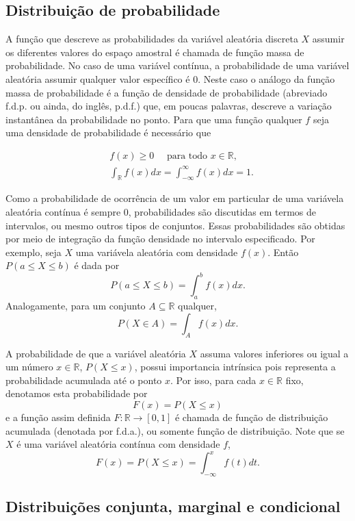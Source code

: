 \documentclass[
]{book}
\theoremstyle{definition}
\theoremstyle{definition}
\theoremstyle{definition}
\theoremstyle{remark}
\begin{document}
\hypertarget{distribuiuxe7uxe3o-de-probabilidade}{%
\subsection{Distribuição de probabilidade}\label{distribuiuxe7uxe3o-de-probabilidade}}

A função que descreve as probabilidades da variável aleatória discreta \(X\) assumir os diferentes valores do espaço amostral é chamada de função massa de probabilidade. No caso de uma variável contínua, a probabilidade de uma variável aleatória assumir qualquer valor específico é 0. Neste caso o análogo da função massa de probabilidade é a função de densidade de probabilidade (abreviado f.d.p. ou ainda, do inglês, p.d.f.) que, em poucas palavras, descreve a variação instantânea da probabilidade no ponto. Para que uma função qualquer \(f\) seja uma densidade de probabilidade é necessário que

\begin{align}
 &f(x)\geq0\quad \mbox{ para todo } x\in\mathbb{R},\nonumber\\
&\int_{\mathbb{R}}f(x)dx=\int_{-\infty}^{\infty}f(x)dx=1.
\label{eq:fdensidade}
\end{align}

Como a probabilidade de ocorrência de um valor em particular de uma variávela aleatória contínua é sempre 0, probabilidades são discutidas em termos de intervalos, ou mesmo outros tipos de conjuntos. Essas probabilidades são obtidas por meio de
integração da função densidade no intervalo especificado. Por exemplo, seja \(X\) uma variávela aleatória com densidade \(f(x)\). Então \(P(a \leq X \leq b)\) é dada por
\[P(a \leq X \leq b)=\int_a^b f(x)dx.\]
Analogamente, para um conjunto \(A\subseteq \mathbb{R}\) qualquer,
\[P(X\in A)=\int_A f(x)dx.\]

A probabilidade de que a variável aleatória \(X\) assuma valores inferiores ou igual a um número \(x\in\mathbb{R}\), \(P(X\leq x)\), possui importancia intrínsica pois representa a probabilidade acumulada até o ponto \(x\). Por isso, para cada \(x\in\mathbb{R}\) fixo, denotamos esta probabilidade por
\[F(x)=P(X\leq x)\]
e a função assim definida \(F:\mathbb{R}\rightarrow[0,1]\) é chamada
de função de distribuição acumulada (denotada por f.d.a.), ou
somente função de distribuição. Note que se \(X\) é uma variável aleatória contínua com densidade \(f\),
\[F(x)=P(X \leq x)=\int_{-\infty}^x f(t)dt.\]

\hypertarget{distribuiuxe7uxf5es-conjunta-marginal-e-condicional}{%
\subsection{Distribuições conjunta, marginal e condicional}\label{distribuiuxe7uxf5es-conjunta-marginal-e-condicional}}
\end{document}
